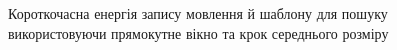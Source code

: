         \begin{figure}[!h]
            \centering

            \caption{Короткочасна енергія запису мовлення й шаблону для пошуку використовуючи прямокутне вікно та крок
                середнього розміру}\label{fig:audio-energy-rect-half}
        \end{figure}

